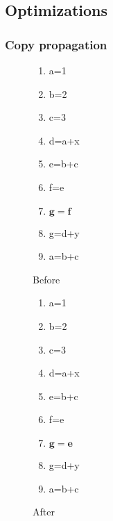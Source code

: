 \documentclass[a4paper]{article}
\begin{document}
\subsection{Optimizations}

\subsubsection{Copy propagation}
        \begin{figure}[H]
            \centering
            \begin{varwidth}{0.45\textwidth}
                \begin{enumerate}[1.]
                    \item a=1
                    \item b=2
                    \item c=3
                    \item d=a+x
                    \item e=b+c
                    \item f=e
                    \item {\color{red}$\mathbf{g=f}$}
                    \item g=d+y
                    \item a=b+c
                \end{enumerate}
                \caption{Before}
            \end{varwidth}
            \begin{varwidth}{0.45\textwidth}
                \begin{enumerate}[1.]
                    \item a=1
                    \item b=2
                    \item c=3
                    \item d=a+x
                    \item e=b+c
                    \item f=e
                    \item {\color{red}$\mathbf{g=e}$}
                    \item g=d+y
                    \item a=b+c
                \end{enumerate}
                \caption{After}
            \end{varwidth}
        \end{figure}
\end{document}
